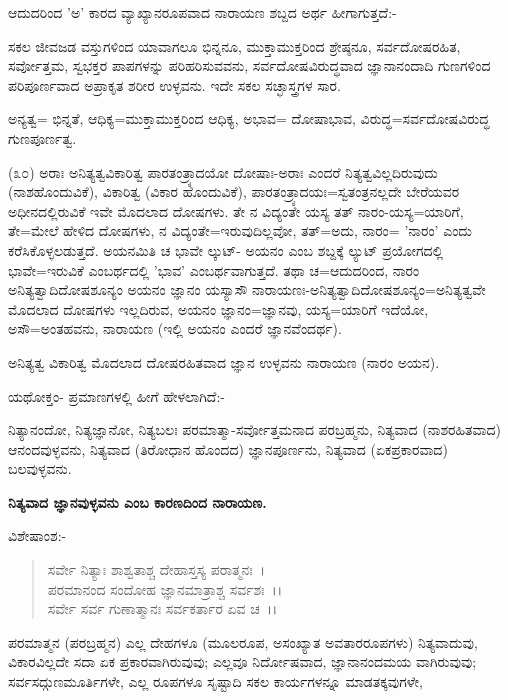 ಆದುದರಿಂದ 'ಅ' ಕಾರದ ವ್ಯಾಖ್ಯಾನರೂಪವಾದ ನಾರಾಯಣ ಶಬ್ದದ ಅರ್ಥ ಹೀಗಾಗುತ್ತದೆ:-

ಸಕಲ ಜೀವಜಡ ವಸ್ತುಗಳಿಂದ ಯಾವಾಗಲೂ ಭಿನ್ನನೂ, ಮುಕ್ತಾಮುಕ್ತರಿಂದ ಶ್ರೇಷ್ಠನೂ, ಸರ್ವದೋಷರಹಿತ, ಸರ್ವೋತ್ತಮ, ಸ್ವಭಕ್ತರ ಪಾಪಗಳನ್ನು ಪರಿಹರಿಸುವವನು, ಸರ್ವದೋಷವಿರುದ್ಧವಾದ ಜ್ಞಾನಾನಂದಾದಿ ಗುಣಗಳಿಂದ ಪರಿಪೂರ್ಣವಾದ ಅಪ್ರಾಕೃತ ಶರೀರ ಉಳ್ಳವನು. ಇದೇ ಸಕಲ ಸಚ್ಛಾಸ್ತ್ರಗಳ ಸಾರ.

ಅನ್ಯತ್ವ= ಭಿನ್ನತೆ, ಆಧಿಕ್ಯ=ಮುಕ್ತಾಮುಕ್ತರಿಂದ ಆಧಿಕ್ಯ, ಅಭಾವ= ದೋಷಾಭಾವ, ವಿರುದ್ಧ=ಸರ್ವದೋಷವಿರುದ್ಧ ಗುಣಪೂರ್ಣತ್ವ.

(೩೦) ಅರಾಃ ಅನಿತ್ಯತ್ವವಿಕಾರಿತ್ವ ಪಾರತಂತ್ರ್ಯಾದಯೋ ದೋಷಾಃ-ಅರಾಃ ಎಂದರೆ ನಿತ್ಯತ್ವವಿಲ್ಲದಿರುವುದು (ನಾಶಹೊಂದುವಿಕೆ), ವಿಕಾರಿತ್ವ (ವಿಕಾರ ಹೊಂದುವಿಕೆ), ಪಾರತಂತ್ರ್ಯಾದಯಃ=ಸ್ವತಂತ್ರನಲ್ಲದೇ ಬೇರೆಯವರ ಅಧೀನದಲ್ಲಿರುವಿಕೆ ಇವೇ ಮೊದಲಾದ ದೋಷಗಳು. ತೇ ನ ವಿದ್ಯಂತೇ ಯಸ್ಯ ತತ್ ನಾರಂ-ಯಸ್ಯ=ಯಾರಿಗೆ, ತೇ=ಮೇಲೆ ಹೇಳಿದ ದೋಷಗಳು, ನ ವಿದ್ಯಂತೇ=ಇರುವುದಿಲ್ಲವೋ, ತತ್=ಅದು, ನಾರಂ= 'ನಾರಂ' ಎಂದು ಕರೆಸಿಕೊಳ್ಳಲಡುತ್ತದೆ. ಅಯನಮಿತಿ ಚ ಭಾವೇ ಲ್ಕುಟ್- ಅಯನಂ ಎಂಬ ಶಬ್ದಕ್ಕೆ ಲ್ಯುಟ್ ಪ್ರಯೋಗದಲ್ಲಿ ಭಾವೇ=ಇರುವಿಕೆ ಎಂಬರ್ಥದಲ್ಲಿ 'ಭಾವ' ಎಂಬರ್ಥವಾಗುತ್ತದೆ. ತಥಾ ಚ=ಆದುದರಿಂದ, ನಾರಂ ಅನಿತ್ಯತ್ವಾದಿದೋಷಶೂನ್ಯಂ ಅಯನಂ ಜ್ಞಾನಂ ಯಸ್ಯಾಸೌ ನಾರಾಯಣಃ-ಅನಿತ್ಯತ್ವಾದಿದೋಷಶೂನ್ಯಂ=ಅನಿತ್ಯತ್ವವೇ ಮೊದಲಾದ ದೋಷಗಳು ಇಲ್ಲದಿರುವ, ಅಯನಂ ಜ್ಞಾನಂ=ಜ್ಞಾನವು, ಯಸ್ಯ=ಯಾರಿಗೆ ಇದೆಯೋ, ಅಸೌ=ಅಂತಹವನು, ನಾರಾಯಣ (ಇಲ್ಲಿ ಅಯನಂ ಎಂದರೆ ಜ್ಞಾನವೆಂದರ್ಥ).

ಅನಿತ್ಯತ್ವ ವಿಕಾರಿತ್ವ ಮೊದಲಾದ ದೋಷರಹಿತವಾದ ಜ್ಞಾನ ಉಳ್ಳವನು ನಾರಾಯಣ (ನಾರಂ ಅಯನ).

ಯಥೋಕ್ತಂ- ಪ್ರಮಾಣಗಳಲ್ಲಿ ಹೀಗೆ ಹೇಳಲಾಗಿದೆ:-

ನಿತ್ಯಾನಂದೋ, ನಿತ್ಯಜ್ಞಾನೋ, ನಿತ್ಯಬಲಃ ಪರಮಾತ್ಮಾ-ಸರ್ವೋತ್ತಮನಾದ ಪರಬ್ರಹ್ಮನು, ನಿತ್ಯವಾದ (ನಾಶರಹಿತವಾದ) ಆನಂದವುಳ್ಳವನು, ನಿತ್ಯವಾದ (ತಿರೋಧಾನ ಹೊಂದದ) ಜ್ಞಾನಪೂರ್ಣನು, ನಿತ್ಯವಾದ (ಏಕಪ್ರಕಾರವಾದ) ಬಲವುಳ್ಳವನು.

\begin{center}
\textbf{ನಿತ್ಯವಾದ ಜ್ಞಾನವುಳ್ಳವನು ಎಂಬ ಕಾರಣದಿಂದ ನಾರಾಯಣ.}
\end{center}

\noindent
ವಿಶೇಷಾಂಶ:-

\begin{verse}
ಸರ್ವೇ ನಿತ್ಯಾಃ ಶಾಶ್ವತಾಶ್ಚ ದೇಹಾಸ್ತಸ್ಯ ಪರಾತ್ಮನಃ~।\\ ಪರಮಾನಂದ ಸಂದೋಹ ಜ್ಞಾನಮಾತ್ರಾಶ್ಚ ಸರ್ವಶಃ~।।\\ ಸರ್ವೇ ಸರ್ವ ಗುಣಾತ್ಮಾನಃ ಸರ್ವಕರ್ತಾರ ಏವ ಚ~।।
\end{verse}


ಪರಮಾತ್ಮನ (ಪರಬ್ರಹ್ಮನ) ಎಲ್ಲ ದೇಹಗಳೂ (ಮೂಲರೂಪ, ಅಸಂಖ್ಯಾತ ಅವತಾರರೂಪಗಳು) ನಿತ್ಯವಾದುವು, ವಿಕಾರವಿಲ್ಲದೇ ಸದಾ ಏಕ ಪ್ರಕಾರವಾಗಿರುವುವು; ಎಲ್ಲವೂ ನಿರ್ದೋಷವಾದ, ಜ್ಞಾನಾನಂದಮಯ ವಾಗಿರುವುವು; ಸರ್ವಸದ್ಗುಣಮೂರ್ತಿಗಳೇ, ಎಲ್ಲ ರೂಪಗಳೂ ಸೃಷ್ಟಾದಿ ಸಕಲ ಕಾರ್ಯಗಳನ್ನೂ ಮಾಡತಕ್ಕವುಗಳೇ,

